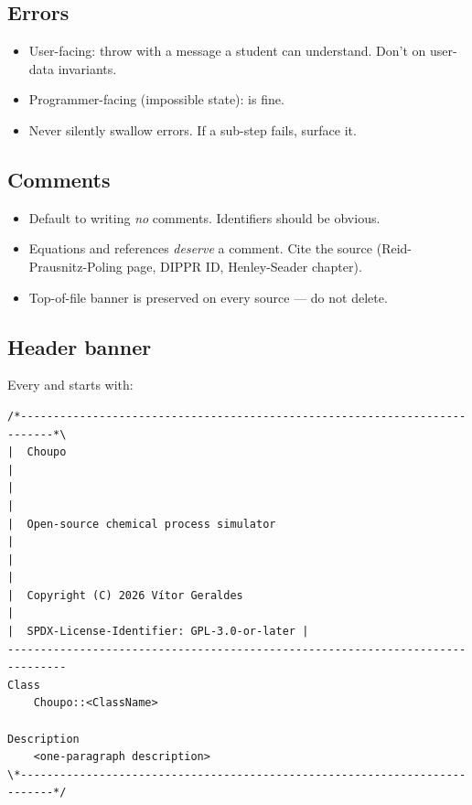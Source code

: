 \documentclass[11pt,a4paper]{article}
\begin{document}
\subsection{Errors}

\begin{itemize}[leftmargin=*,nosep]
  \item User-facing: throw  with a message a
        student can understand. Don't  on user-data
        invariants.
  \item Programmer-facing (impossible state):  is fine.
  \item Never silently swallow errors. If a sub-step fails, surface it.
\end{itemize}

\subsection{Comments}

\begin{itemize}[leftmargin=*,nosep]
  \item Default to writing \emph{no} comments. Identifiers should be
        obvious.
  \item Equations and references \emph{deserve} a comment. Cite the
        source (Reid-Prausnitz-Poling page, DIPPR ID, Henley-Seader
        chapter).
  \item Top-of-file banner is preserved on every source --- do not
        delete.
\end{itemize}

\subsection{Header banner}

Every  and  starts with:

\begin{lstlisting}
/*---------------------------------------------------------------------------*\
|  Choupo                                                                     |
|                                                                             |
|  Open-source chemical process simulator                                     |
|                                                                             |
|  Copyright (C) 2026 Vítor Geraldes                                          |
|  SPDX-License-Identifier: GPL-3.0-or-later |
-------------------------------------------------------------------------------
Class
    Choupo::<ClassName>

Description
    <one-paragraph description>
\*---------------------------------------------------------------------------*/
\end{lstlisting}
\end{document}
